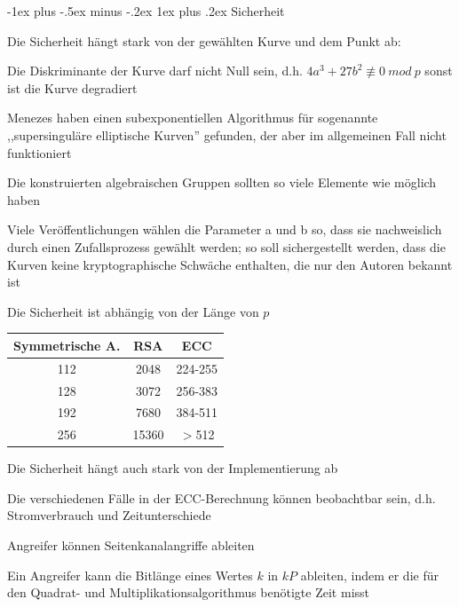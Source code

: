 \documentclass[a4paper]{article}
\makeatletter
\renewcommand{\subsubsection}{\@startsection{subsubsection}{3}{0mm}%
 {-1ex plus -.5ex minus -.2ex}%
 {1ex plus .2ex}%
 {\normalfont\small\bfseries}}
\makeatother
\begin{document}
\begin{multicols}{3}
      \subsubsection{Sicherheit}
      \begin{itemize*}
            \item Die Sicherheit hängt stark von der gewählten Kurve und dem Punkt ab:
            \item Die Diskriminante der Kurve darf nicht Null sein, d.h. $4a^3+27b^2\not\equiv 0\ mod\ p$ sonst ist die Kurve degradiert %
            \item Menezes haben einen subexponentiellen Algorithmus für sogenannte ,,supersinguläre elliptische Kurven'' gefunden, der aber im allgemeinen Fall nicht funktioniert
            \item Die konstruierten algebraischen Gruppen sollten so viele Elemente wie möglich haben
            \item Viele Veröffentlichungen wählen die Parameter a und b so, dass sie nachweislich durch einen Zufallsprozess gewählt werden; so soll sichergestellt werden, dass die Kurven keine kryptographische Schwäche enthalten, die nur den Autoren bekannt ist
            \item Die Sicherheit ist abhängig von der Länge von $p$
            \begin{tabular}{c|c|c}
                  Symmetrische A. & RSA   & ECC     \\\hline
                  112             & 2048  & 224-255 \\
                  128             & 3072  & 256-383 \\
                  192             & 7680  & 384-511 \\
                  256             & 15360 & $>$512
            \end{tabular}
            \item Die Sicherheit hängt auch stark von der Implementierung ab
            \begin{itemize*}
                  \item Die verschiedenen Fälle in der ECC-Berechnung können beobachtbar sein, d.h. Stromverbrauch und Zeitunterschiede
                  \item Angreifer können Seitenkanalangriffe ableiten%
                  \item Ein Angreifer kann die Bitlänge eines Wertes $k$ in $kP$ ableiten, indem er die für den Quadrat- und Multiplikationsalgorithmus benötigte Zeit misst

\end{itemize*}
\end{itemize*}
\end{multicols}
\end{document}
